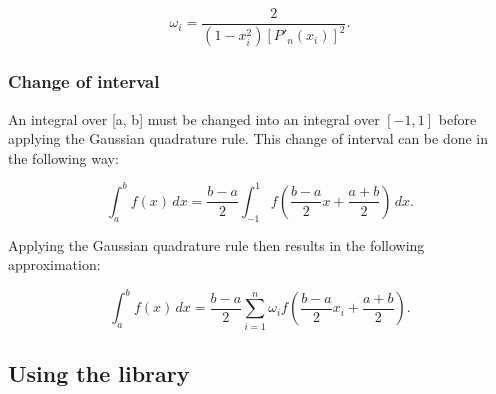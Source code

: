 \[ \omega_{i}={\frac {2}{\left(1-x_{i}^{2}\right)[P'_{n}(x_{i})]^{2}}}. \]\hypertarget{group__GL_gl_change_of_interval}{}\subsubsection{Change of interval}\label{group__GL_gl_change_of_interval}
An integral over \mbox{[}a, b\mbox{]} must be changed into an integral over $[−1, 1]$ before applying the Gaussian quadrature rule. This change of interval can be done in the following way\+:

\[ \int_{a}^{b}f(x)\,dx={\frac {b-a}{2}}\int_{-1}^{1}f\left({\frac {b-a}{2}}x+{\frac {a+b}{2}}\right)\,dx. \]

Applying the Gaussian quadrature rule then results in the following approximation\+:

\[ \int_{a}^{b}f(x)\,dx={\frac {b-a}{2}}\sum _{i=1}^{n}\omega_{i}f\left({\frac {b-a}{2}}x_{i}+{\frac {a+b}{2}}\right). \]\hypertarget{group__GL_gl_usage}{}\subsection{Using the library}\label{group__GL_gl_usage}
